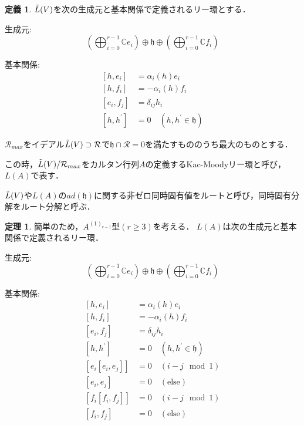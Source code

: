 \documentclass[dvipdfmx,autodetect-engine]{article}
\theoremstyle{definition}
\newtheorem{Def}{定義}
\newtheorem{Th}{定理}
\begin{document}
    \begin{Def}
        $\Tilde{L}(V)$を次の生成元と基本関係で定義されるリー環とする．
        
        生成元:
        \[
            (\bigoplus_{i = 0}^{r-1} \mathbb{C}e_i) \oplus \mathfrak{h} \oplus (\bigoplus_{i = 0}^{r-1} \mathbb{C}f_i)
        \]
        
        基本関係:
        \begin{align*}
            \left[h, e_{i}\right]&=\alpha_{i}(h) e_{i} \\
            \left[h, f_{i}\right]&=-\alpha_{i}(h) f_{i} \\
            \left[e_{i}, f_{j}\right]&=\delta_{i j} h_{i} \\
            \left[h, h^{\prime}\right]&=0 \quad \left(h, h^{\prime} \in \mathfrak{h}\right)
        \end{align*}
        
        $\mathcal{R}_{max}$をイデアル$\Tilde{L}(V) \supset \mathcal{R}$で$\mathfrak{h}\cap\mathcal{R} = 0$を満たすもののうち最大のものとする．
        
        この時，$\Tilde{L}(V)/\mathcal{R}_{max}$をカルタン行列$A$の定義するKac-Moodyリー環と呼び，$L(A)$で表す．
        
        $\Tilde{L}(V)$や$L(A)$の$ad(\mathfrak{h})$に関する非ゼロ同時固有値をルートと呼び，同時固有分解をルート分解と呼ぶ．
    \end{Def}
    
    \begin{Th}
        簡単のため，$A^{(1)_{r-1}}$型$(r \geq 3)$を考える．
        $L(A)$は次の生成元と基本関係で定義されるリー環．
        
        生成元:
        \[
            (\bigoplus_{i = 0}^{r-1} \mathbb{C}e_i) \oplus \mathfrak{h} \oplus (\bigoplus_{i = 0}^{r-1} \mathbb{C}f_i)
        \]
        
        基本関係:
        \begin{align*}
            \left[h, e_{i}\right]&=\alpha_{i}(h) e_{i} \\
            \left[h, f_{i}\right]&=-\alpha_{i}(h) f_{i} \\
            \left[e_{i}, f_{j}\right]&=\delta_{i j} h_{i} \\
            \left[h, h^{\prime}\right]&=0 \quad \left(h, h^{\prime} \in \mathfrak{h}\right)\\
            [e_i[e_i, e_j]] &= 0 \quad (i - j \mod 1)\\
            [e_i, e_j] &= 0 \quad (\text{else})\\
            [f_i[f_i, f_j]] &= 0 \quad (i - j \mod 1)\\
            [f_i, f_j] &= 0 \quad (\text{else})\\
        \end{align*}
    \end{Th}
    
\end{document}
